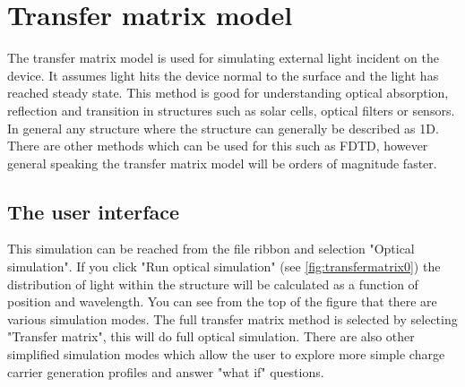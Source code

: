 \section{Transfer matrix model}
The transfer matrix model is used for simulating external light incident on the device. It assumes light hits the device normal to the surface and the light has reached steady state. This method is good for understanding optical absorption, reflection and transition in structures such as solar cells, optical filters or sensors.  In general any structure where the structure can generally be described as 1D. There are other methods which can be used for this such as FDTD, however general speaking the transfer matrix model will be orders of magnitude faster.

\subsection{The user interface}
This simulation can be reached from the file ribbon and selection "Optical simulation".  If you click "Run optical simulation" (see \ref{fig:transfermatrix0}) the distribution of light within the structure will be calculated as a function of position and wavelength. You can see from the top of the figure that there are various simulation modes. The full transfer matrix method is selected by selecting "Transfer matrix", this will do full optical simulation.  There are also other simplified simulation modes which allow the user to explore more simple charge carrier generation profiles and answer "what if" questions.

